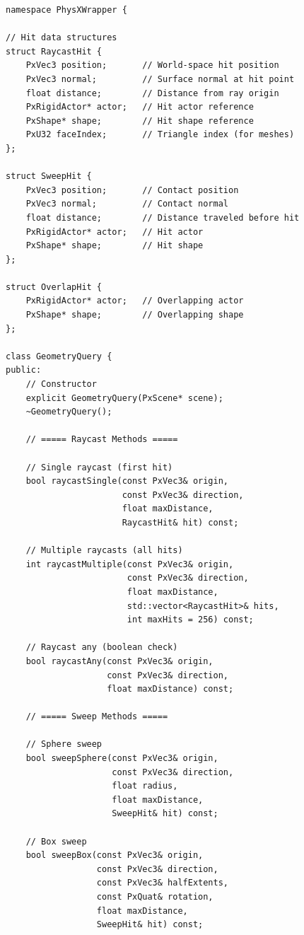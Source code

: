 \begin{lstlisting}[style=cpp, caption=GeometryQuery Conceptual Interface]
namespace PhysXWrapper {

// Hit data structures
struct RaycastHit {
    PxVec3 position;       // World-space hit position
    PxVec3 normal;         // Surface normal at hit point
    float distance;        // Distance from ray origin
    PxRigidActor* actor;   // Hit actor reference
    PxShape* shape;        // Hit shape reference
    PxU32 faceIndex;       // Triangle index (for meshes)
};

struct SweepHit {
    PxVec3 position;       // Contact position
    PxVec3 normal;         // Contact normal
    float distance;        // Distance traveled before hit
    PxRigidActor* actor;   // Hit actor
    PxShape* shape;        // Hit shape
};

struct OverlapHit {
    PxRigidActor* actor;   // Overlapping actor
    PxShape* shape;        // Overlapping shape
};

class GeometryQuery {
public:
    // Constructor
    explicit GeometryQuery(PxScene* scene);
    ~GeometryQuery();

    // ===== Raycast Methods =====

    // Single raycast (first hit)
    bool raycastSingle(const PxVec3& origin,
                       const PxVec3& direction,
                       float maxDistance,
                       RaycastHit& hit) const;

    // Multiple raycasts (all hits)
    int raycastMultiple(const PxVec3& origin,
                        const PxVec3& direction,
                        float maxDistance,
                        std::vector<RaycastHit>& hits,
                        int maxHits = 256) const;

    // Raycast any (boolean check)
    bool raycastAny(const PxVec3& origin,
                    const PxVec3& direction,
                    float maxDistance) const;

    // ===== Sweep Methods =====

    // Sphere sweep
    bool sweepSphere(const PxVec3& origin,
                     const PxVec3& direction,
                     float radius,
                     float maxDistance,
                     SweepHit& hit) const;

    // Box sweep
    bool sweepBox(const PxVec3& origin,
                  const PxVec3& direction,
                  const PxVec3& halfExtents,
                  const PxQuat& rotation,
                  float maxDistance,
                  SweepHit& hit) const;


\end{lstlisting}
